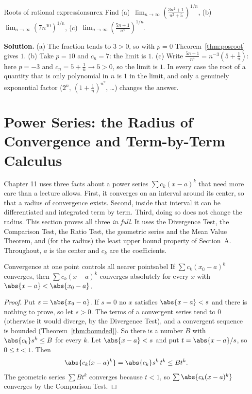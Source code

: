 \documentclass[11pt]{article}
\begin{document}
\begin{exmp}{Roots of rational expressions}{nrex}
Find (a)~$\displaystyle\lim_{n\to\infty}\left(\frac{3n^2+1}{n^2+5}\right)^{1/n}$, (b)~$\displaystyle\lim_{n\to\infty}\left(7n^{10}\right)^{1/n}$, (c)~$\displaystyle\lim_{n\to\infty}\left(\frac{5n+1}{n^4}\right)^{1/n}$.

\textbf{Solution.} (a) The fraction tends to $3>0$, so with $p=0$ Theorem~\ref{thm:posroot} gives $1$. (b) Take $p=10$ and $c_n=7$: the limit is $1$. (c) Write $\frac{5n+1}{n^4}=n^{-3}\left(5+\frac1n\right)$: here $p=-3$ and $c_n=5+\frac1n\to5>0$, so the limit is $1$. In every case the root of a quantity that is only polynomial in $n$ is $1$ in the limit, and only a genuinely exponential factor ($2^n$, $\left(1+\frac1n\right)^{n^2}$, \dots) changes the answer.
\end{exmp}

\section{Power Series: the Radius of Convergence and Term-by-Term Calculus}

Chapter 11 uses three facts about a power series $\sum c_k(x-a)^k$ that need more care than a lecture allows. First, it converges on an interval around its center, so that a radius of convergence exists. Second, inside that interval it can be differentiated and integrated term by term. Third, doing so does not change the radius. This section proves all three \emph{in full}. It uses the Divergence Test, the Comparison Test, the Ratio Test, the geometric series and the Mean Value Theorem, and (for the radius) the least upper bound property of Section~A. Throughout, $a$ is the center and $c_k$ are the coefficients.

\begin{thm}{Convergence at one point controls all nearer points}{abel}
If $\sum c_k(x_0-a)^k$ converges, then $\sum c_k(x-a)^k$ converges absolutely for every $x$ with $\abs{x-a}<\abs{x_0-a}$.
\end{thm}
\begin{proof}
Put $s=\abs{x_0-a}$. If $s=0$ no $x$ satisfies $\abs{x-a}<s$ and there is nothing to prove, so let $s>0$. The terms of a convergent series tend to $0$ (otherwise it would diverge, by the Divergence Test), and a convergent sequence is bounded (Theorem~\ref{thm:bounded}). So there is a number $B$ with $\abs{c_k}s^k\le B$ for every $k$. Let $\abs{x-a}<s$ and put $t=\abs{x-a}/s$, so $0\le t<1$. Then
\[
\abs{c_k(x-a)^k}=\abs{c_k}s^k\,t^k\le Bt^k .
\]
The geometric series $\sum Bt^k$ converges because $t<1$, so $\sum\abs{c_k(x-a)^k}$ converges by the Comparison Test.
\end{proof}
\end{document}
